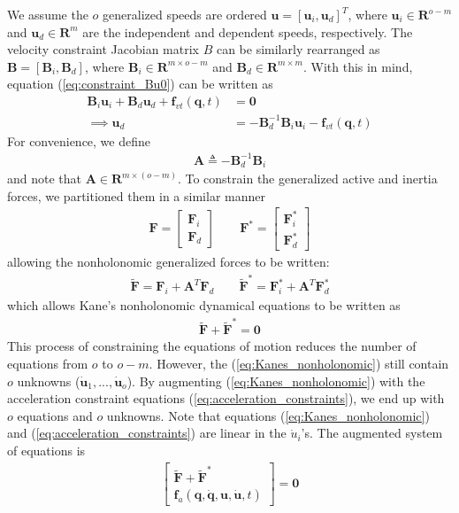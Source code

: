 \documentclass[smallcondensed,final]{svjour3}                     %
\begin{document}
We assume the $o$ generalized speeds are ordered $\mathbf{u} = [\mathbf{u}_i,
\mathbf{u}_d]^T$, where $\mathbf{u}_i\in\mathbf{R}^{o-m}$ and
$\mathbf{u}_d\in\mathbf{R}^{m}$ are the independent and dependent speeds,
respectively. The velocity constraint Jacobian matrix $B$ can be similarly
rearranged as $\mathbf{B} = [\mathbf{B}_i, \mathbf{B}_d]$, where
$\mathbf{B}_i\in \mathbf{R}^{m \times o-m}$ and $\mathbf{B}_d \in \mathbf{R}^{m
\times m}$. With this in mind, equation (\ref{eq:constraint_Bu0}) can be
written as
\begin{align}
\mathbf{B}_i \mathbf{u}_i + \mathbf{B}_d \mathbf{u}_d + \mathbf{f}_{vt}(\mathbf{q}, t) &= \mathbf{0} \\
\implies \mathbf{u}_d &= -\mathbf{B}_d^{-1} \mathbf{B}_i \mathbf{u}_i - \mathbf{f}_{vt}(\mathbf{q}, t)
\end{align}
For convenience, we define
\begin{align}
\label{eq:constraint_A}
\mathbf{A} \triangleq - \mathbf{B}_{d}^{-1} \mathbf{B}_i
\end{align}
and note that $\mathbf{A}\in\mathbf{R}^{m \times (o - m)}$. To constrain the
generalized active and inertia forces, we partitioned them in a similar
manner
\begin{align}
\label{eq:F_Fstar_rewrite}
\mathbf{F} = \begin{bmatrix} \mathbf{F}_i \\ \mathbf{F}_d \end{bmatrix} \quad
\quad \mathbf{F}^* = \begin{bmatrix} \mathbf{F}^*_i \\ \mathbf{F}^*_d
\end{bmatrix}
\end{align}
allowing the nonholonomic generalized forces to be written:
\begin{align}
\label{eq:F_Fstar_nonholonomic}
\tilde{\mathbf{F}} = \mathbf{F}_i + \mathbf{A}^T \mathbf{F}_d \quad \quad
\tilde{\mathbf{F}}^* = \mathbf{F}_i^* + \mathbf{A}^T \mathbf{F}_d^*
\end{align}
which allows Kane's nonholonomic dynamical equations to be written as
\begin{align}
\label{eq:Kanes_nonholonomic}
\tilde{\mathbf{F}} + \tilde{\mathbf{F}}^* = \mathbf{0}
\end{align}
This process of constraining the equations of motion reduces the number of
equations from $o$ to $o-m$. However, the (\ref{eq:Kanes_nonholonomic}) still
contain $o$ unknowns ($\dot{\mathbf{u}}_1,...,\dot{\mathbf{u}}_o$). By
augmenting (\ref{eq:Kanes_nonholonomic}) with the acceleration constraint
equations (\ref{eq:acceleration_constraints}), we end up with $o$ equations and
$o$ unknowns. Note that equations (\ref{eq:Kanes_nonholonomic}) and
(\ref{eq:acceleration_constraints}) are linear in the $\dot{u}_i$'s. The
augmented system of equations is
\begin{align}
\label{eq:F_Fstar_f_a}
\begin{bmatrix}
\tilde{\mathbf{F}} + \tilde{\mathbf{F}}^* \\
\mathbf{f}_a (\mathbf{q}, \dot{\mathbf{q}}, \mathbf{u}, \dot{\mathbf{u}}, t)
\end{bmatrix} = \mathbf{0}
\end{align}
\end{document}
